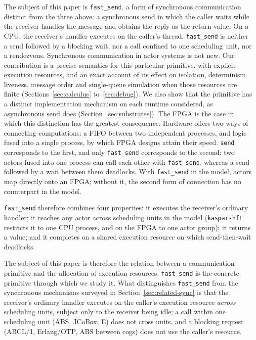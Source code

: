 \documentclass[11pt]{article}
\theoremstyle{definition}
\theoremstyle{remark}
\newcommand{\fs}{\texttt{fast\_send}}
\newcommand{\snd}{\texttt{send}}
\newcommand{\kh}{\texttt{kaspar-hft}}
\begin{document}
The subject of this paper is \fs{}, a form of synchronous communication distinct from the
three above: a synchronous send in which the caller waits while the receiver handles the
message and obtains the reply as the return value. On a CPU, the receiver's handler
executes on the caller's thread. \fs{} is neither a send followed by a blocking wait, nor
a call confined to one scheduling unit, nor a rendezvous. Synchronous communication in
actor systems is not new. Our contribution is a precise semantics for this particular
primitive, with explicit execution resources, and an exact account of its effect on
isolation, determinism, liveness, message order and single-queue simulation when those
resources are finite (Sections~\ref{sec:calculus} to~\ref{sec:debug}). We also show that
the primitive has a distinct implementation mechanism on each runtime considered, as
asynchronous send does (Section~\ref{sec:substrates}). The FPGA is the case in which
this distinction has the greatest consequence. Hardware offers two ways of connecting
computations: a FIFO between two independent processes, and logic fused into a single
process, by which FPGA designs attain their speed. \snd{} corresponds to the first, and
only \fs{} corresponds to the second: two actors fused into one process can call each
other with \fs{}, whereas a send followed by a wait between them deadlocks. With \fs{}
in the model, actors map directly onto an FPGA; without it, the second form of
connection has no counterpart in the model.

\fs{} therefore combines four properties: it executes the receiver's ordinary handler;
it reaches any actor across scheduling units in the model (\kh{} restricts it to one CPU
process, and on the FPGA to one actor group); it returns a value; and it completes on a
shared execution resource on which send-then-wait deadlocks.

The subject of this paper is therefore the relation between a communication primitive
and the allocation of execution resources: \fs{} is the concrete primitive through which
we study it. What distinguishes \fs{} from the synchronous mechanisms surveyed in
Section~\ref{sec:related-sync} is that the receiver's ordinary handler executes on the
caller's execution resource \emph{across} scheduling units, subject only to the
receiver being idle; a call within one scheduling unit (ABS, JCoBox, E) does not cross
units, and a blocking request (ABCL/1, Erlang/OTP, ABS between cogs) does not use the
caller's resource.
\end{document}
